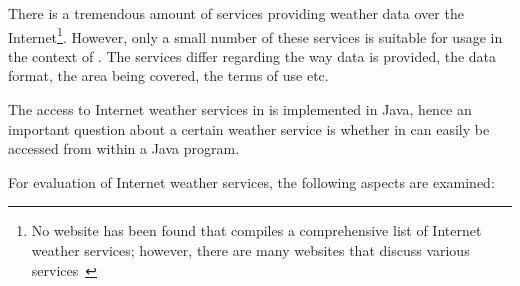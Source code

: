 There is a tremendous amount of services providing weather data over the Internet\footnote{No website has been found that compiles a comprehensive list of Internet weather services; however, there are many websites that discuss various services~\cite{WeatherServices1,WeatherServices2,WeatherServices3}}. However, only a small number of these services is suitable for usage in the context of \smarthomeweather. The services differ regarding the way data is provided, the data format, the area being covered, the terms of use etc.

The access to Internet weather services in \smarthomeweather is implemented in Java, hence an important question about a certain weather service is whether in can easily be accessed from within a Java program.

For evaluation of Internet weather services, the following aspects are examined:

